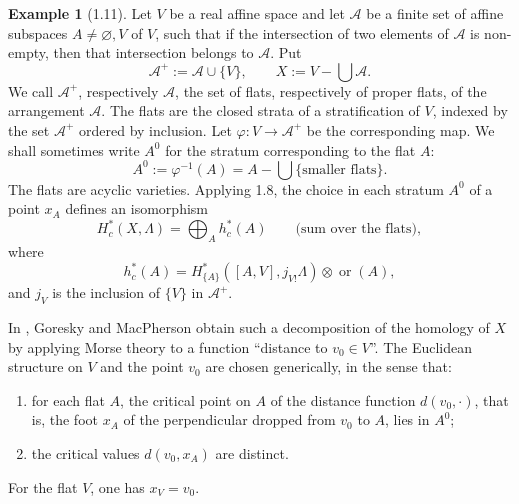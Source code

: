 \documentclass[11pt]{article}
\theoremstyle{definition}
\newtheorem{example}[theorem]{Example}
\newcommand{\ornt}{\operatorname{or}}
\begin{document}
\begin{example}[1.11]
Let $V$ be a real affine space and let $\mathcal A$ be a finite set of affine subspaces $A\neq\varnothing,V$ of $V$, such that if the intersection of two elements of $\mathcal A$ is non-empty, then that intersection belongs to $\mathcal A$.  Put
\[
\mathcal A^+:=\mathcal A\cup\{V\},\qquad X:=V-\bigcup\mathcal A.
\]
We call $\mathcal A^+$, respectively $\mathcal A$, the set of flats, respectively of proper flats, of the arrangement $\mathcal A$.  The flats are the closed strata of a stratification of $V$, indexed by the set $\mathcal A^+$ ordered by inclusion.  Let $\varphi:V\to\mathcal A^+$ be the corresponding map.  We shall sometimes write $A^0$ for the stratum corresponding to the flat $A$:
\begin{equation}
A^0:=\varphi^{-1}(A)=A-\bigcup\{\text{smaller flats}\}.\tag{1.11.1}
\end{equation}
The flats are acyclic varieties.  Applying 1.8, the choice in each stratum $A^0$ of a point $x_A$ defines an isomorphism
\begin{equation}
H_c^*(X,\Lambda)=\bigoplus_A h_c^*(A)\qquad\text{(sum over the flats)},\tag{1.11.2}
\end{equation}
where
\[
h_c^*(A)=H^*_{\{A\}}([A,V],j_{V!}\Lambda)\otimes\ornt(A),
\]
and $j_V$ is the inclusion of $\{V\}$ in $\mathcal A^+$.

In \cite{GM}, Goresky and MacPherson obtain such a decomposition of the homology of $X$ by applying Morse theory to a function ``distance to $v_0\in V$''.  The Euclidean structure on $V$ and the point $v_0$ are chosen generically, in the sense that:
\begin{enumerate}[label=(\alph*)]
\item for each flat $A$, the critical point on $A$ of the distance function $d(v_0,\cdot)$, that is, the foot $x_A$ of the perpendicular dropped from $v_0$ to $A$, lies in $A^0$;
\item the critical values $d(v_0,x_A)$ are distinct.
\end{enumerate}
For the flat $V$, one has $x_V=v_0$.


\end{example}
\end{document}
